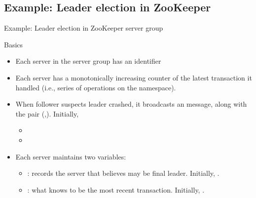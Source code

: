 \subsection{Example: Leader election in ZooKeeper}
\begin{frame}{Example: Leader election in ZooKeeper server group}
  \begin{block}{Basics}
    \begin{itemize}\firmlist
      \item Each server  in the server group has an identifier 
      \item Each server has a monotonically increasing counter  of the latest transaction it
            handled (i.e., series of operations on the namespace).
      \item When follower  suspects leader crashed, it broadcasts an  message, along with the pair
            (,). Initially,
            \begin{itemize}\firmlist
              \item {}
              \item {}
            \end{itemize}
      \item Each server  maintains two variables:
            \begin{itemize}
              \item {}: records the server that  believes may be final
                    leader. \newline
                    Initially, .
              \item {}: what  knows to be the most recent transaction. \newline
                    Initially, .
            \end{itemize}
    \end{itemize}
  \end{block}
\end{frame}
